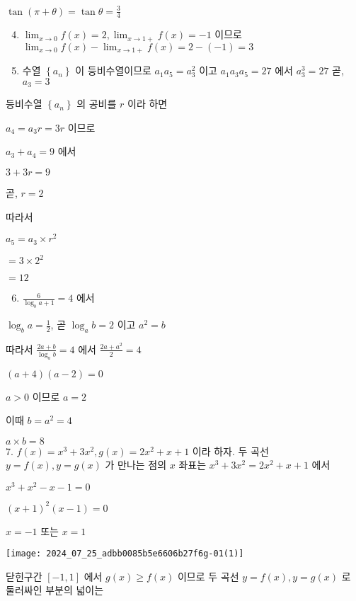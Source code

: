 \documentclass[10pt]{article}
\begin{document}
$\tan (\pi+\theta)=\tan \theta=\frac{3}{4}$

\begin{enumerate}
  \setcounter{enumi}{3}
  \item $\lim _{x \rightarrow 0} f(x)=2, \lim _{x \rightarrow 1+} f(x)=-1$ 이므로 $\lim _{x \rightarrow 0} f(x)-\lim _{x \rightarrow 1+} f(x)=2-(-1)=3$

  \item 수열 $\left\{a_{n}\right\}$ 이 등비수열이므로 $a_{1} a_{5}=a_{3}^{2}$ 이고 $a_{1} a_{3} a_{5}=27$ 에서 $a_{3}^{3}=27$ 곧, $a_{3}=3$

\end{enumerate}

등비수열 $\left\{a_{n}\right\}$ 의 공비를 $r$ 이라 하면

$a_{4}=a_{3} r=3 r$ 이므로

$a_{3}+a_{4}=9$ 에서

$3+3 r=9$

곧, $r=2$

따라서

$a_{5}=a_{3} \times r^{2}$

$=3 \times 2^{2}$

$=12$

\begin{enumerate}
  \setcounter{enumi}{5}
  \item $\frac{6}{\log _{b} a+1}=4$ 에서
\end{enumerate}

$\log _{b} a=\frac{1}{2}$, 곧 $\log _{a} b=2$ 이고 $a^{2}=b$

따라서 $\frac{2 a+b}{\log _{a} b}=4$ 에서 $\frac{2 a+a^{2}}{2}=4$

$(a+4)(a-2)=0$

$a>0$ 이므로 $a=2$

이때 $b=a^{2}=4$

$a \times b=8$\\
7. $f(x)=x^{3}+3 x^{2}, g(x)=2 x^{2}+x+1$ 이라 하자. 두 곡선 $y=f(x), y=g(x)$ 가 만나는 점의 $x$ 좌표는 $x^{3}+3 x^{2}=2 x^{2}+x+1$ 에서

$x^{3}+x^{2}-x-1=0$

$(x+1)^{2}(x-1)=0$

$x=-1$ 또는 $x=1$

\begin{center}
\texttt{[image: 2024\_07\_25\_adbb0085b5e6606b27f6g-01(1)]}
\end{center}

닫힌구간 $[-1,1]$ 에서 $g(x) \geq f(x)$ 이므로 두 곡선 $y=f(x), y=g(x)$ 로 둘러싸인 부분의 넓이는
\end{document}
